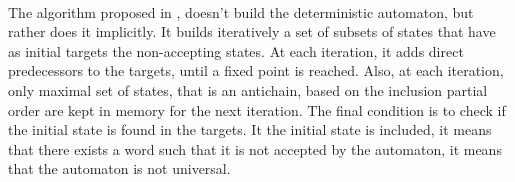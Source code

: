 \documentclass[11pt,a4paper]{article}
\DeclarePairedDelimiter{\ceil}{\lceil}{\rceil}
\theoremstyle{definition}
\begin{document}


\paragraph{}

The algorithm proposed in \cite{AC_universality}, doesn't build
the deterministic automaton, but rather does it implicitly.
It builds iteratively a set of subsets of states
that have as initial targets the non-accepting states.
At each iteration,
it adds direct
predecessors to the targets, until a fixed point is reached.
Also, at each iteration,
only maximal set of states, that is an antichain,
based on the inclusion partial order are kept
in memory for the next iteration.
The final condition is to check if the initial state is found
in the targets. It the initial state is included, it means that
there exists a word such that it is not accepted by
the automaton, it means that the automaton is not universal.
\end{document}
